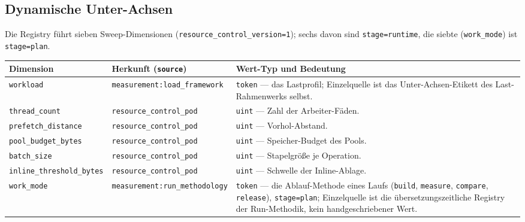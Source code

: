 \subsection*{Dynamische Unter-Achsen}

Die Registry führt sieben Sweep-Dimensionen (\texttt{resource\_\allowbreak{}control\_\allowbreak{}version=1}); sechs davon sind \texttt{stage=runtime}, die siebte (\texttt{work\_\allowbreak{}mode}) ist \texttt{stage=plan}.

\begin{scriptsize}
\begin{longtable}{@{}>{\raggedright\arraybackslash}p{3.6cm} >{\raggedright\arraybackslash}p{4.4cm} >{\raggedright\arraybackslash}p{5.5cm}@{}}
\toprule
Dimension & Herkunft (\texttt{source}) & Wert-Typ und Bedeutung \\
\midrule
\endhead%
\texttt{workload} & \texttt{measurement:\allowbreak{}load\_\allowbreak{}framework} & \texttt{token} --- das Lastprofil; Einzelquelle ist das Unter-Achsen-Etikett des Last-Rahmenwerks selbst. \\
\texttt{thread\_\allowbreak{}count} & \texttt{resource\_\allowbreak{}control\_\allowbreak{}pod} & \texttt{uint} --- Zahl der Arbeiter-Fäden. \\
\texttt{prefetch\_\allowbreak{}distance} & \texttt{resource\_\allowbreak{}control\_\allowbreak{}pod} & \texttt{uint} --- Vorhol-Abstand. \\
\texttt{pool\_\allowbreak{}budget\_\allowbreak{}bytes} & \texttt{resource\_\allowbreak{}control\_\allowbreak{}pod} & \texttt{uint} --- Speicher-Budget des Pools. \\
\texttt{batch\_\allowbreak{}size} & \texttt{resource\_\allowbreak{}control\_\allowbreak{}pod} & \texttt{uint} --- Stapelgröße je Operation. \\
\texttt{inline\_\allowbreak{}threshold\_\allowbreak{}bytes} & \texttt{resource\_\allowbreak{}control\_\allowbreak{}pod} & \texttt{uint} --- Schwelle der Inline-Ablage. \\
\texttt{work\_\allowbreak{}mode} & \texttt{measurement:\allowbreak{}run\_\allowbreak{}methodology} & \texttt{token} --- die Ablauf-Methode eines Laufs (\texttt{build}, \texttt{measure}, \texttt{compare}, \texttt{release}), \texttt{stage=plan}; Einzelquelle ist die übersetzungszeitliche Registry der Run-Methodik, kein handgeschriebener Wert. \\
\bottomrule
\end{longtable}
\end{scriptsize}

